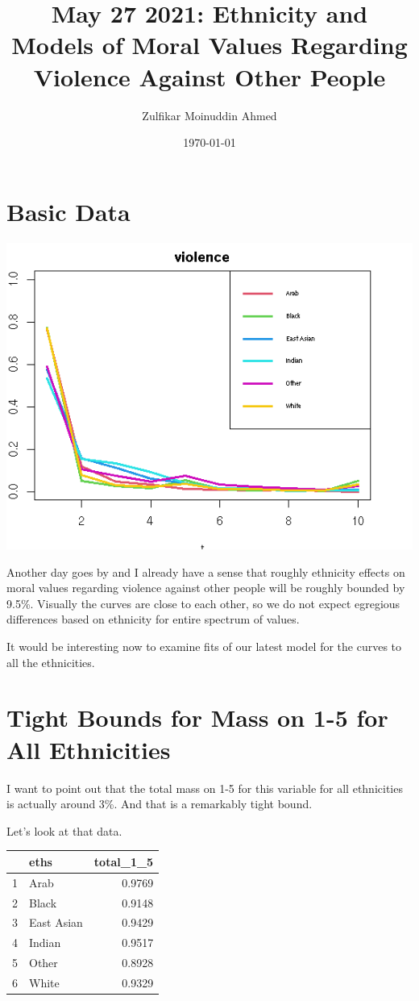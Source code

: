 \documentclass{amsart}
\title{May 27 2021:  Ethnicity and Models of Moral Values Regarding Violence Against Other People}
\author{Zulfikar Moinuddin Ahmed}
\date{\today}
\begin{document}
\maketitle

\section{Basic Data}

\includegraphics[scale=0.8]{eth_viol.png}

Another day goes by and I already have a sense that roughly ethnicity effects on moral values regarding violence against other people will be roughly bounded by 9.5\%. Visually the curves are close to each other, so we do not expect egregious differences based on ethnicity for entire spectrum of values.

It would be interesting now to examine fits of our latest model for the curves to all the ethnicities.

\section{Tight Bounds for Mass on 1-5 for All Ethnicities}

I want to point out that the total mass on 1-5 for this variable for all ethnicities is actually around 3\%.  And that is a remarkably tight bound.  

Let's look at that data.
\begin{table}[ht]
\centering
\begin{tabular}{rlr}
  \hline
 & eths & total\_1\_5 \\ 
  \hline
1 & Arab & 0.9769 \\ 
  2 & Black & 0.9148 \\ 
  3 & East Asian & 0.9429 \\ 
  4 & Indian & 0.9517 \\ 
  5 & Other & 0.8928 \\ 
  6 & White & 0.9329 \\ 
   \hline
\end{tabular}
\end{table}
\end{document}
